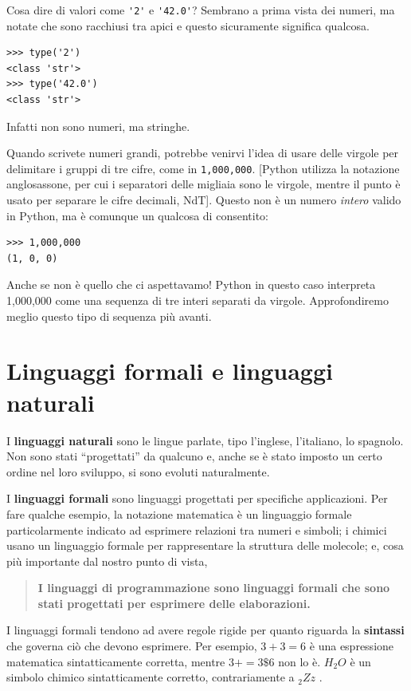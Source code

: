 \documentclass[10pt]{book}
\begin{document}
Cosa dire di valori come \verb"'2'" e \verb"'42.0'"?
Sembrano a prima vista dei numeri, ma notate che sono racchiusi tra apici e questo sicuramente significa qualcosa. 

\begin{verbatim}
>>> type('2')
<class 'str'>
>>> type('42.0')
<class 'str'>
\end{verbatim}
%
Infatti non sono numeri, ma stringhe.

Quando scrivete numeri grandi, potrebbe venirvi l'idea di usare delle virgole per delimitare i gruppi di tre cifre, come in {\tt 1,000,000}. [Python utilizza la notazione anglosassone, per cui i separatori delle migliaia sono le virgole, mentre il punto è usato per separare le cifre decimali, NdT]. Questo non è un numero {\em intero} valido in Python, ma è comunque un qualcosa di consentito:

\begin{verbatim}
>>> 1,000,000
(1, 0, 0)
\end{verbatim}
%
Anche se non è quello che ci aspettavamo! Python in questo caso interpreta 1,000,000 come una sequenza di tre interi separati da virgole. Approfondiremo meglio questo tipo di sequenza più avanti.


\section{Linguaggi formali e linguaggi naturali}

I {\bf linguaggi naturali} sono le lingue parlate, tipo l'inglese, l'italiano, lo spagnolo. Non sono stati ``progettati'' da qualcuno e, anche se è stato imposto un certo ordine nel loro sviluppo, si sono evoluti naturalmente.

I {\bf linguaggi formali} sono linguaggi progettati per specifiche   applicazioni. Per fare qualche esempio, la notazione matematica è un linguaggio formale particolarmente indicato ad esprimere relazioni tra numeri e simboli; i chimici usano un linguaggio formale per rappresentare la struttura delle molecole; e, cosa più importante dal nostro punto di vista, 

\begin{quote}
{\bf I linguaggi di programmazione sono linguaggi formali che sono
   stati progettati per esprimere delle elaborazioni.}
\end{quote}

I linguaggi formali tendono ad avere regole rigide per quanto riguarda la {\bf sintassi} che governa ciò che devono esprimere. Per esempio,
$3 + 3 = 6$ è una espressione matematica sintatticamente corretta, mentre
$3 += 3 \$ 6$ non lo è.
$H_2O$ è un simbolo chimico sintatticamente corretto, contrariamente a $_2Zz$ .
\end{document}
